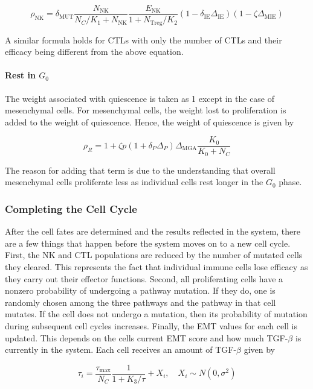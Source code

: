 \documentclass[11pt]{article}
\begin{document}
\begin{equation}\tag{2.3}
\rho_{\text{NK}} =\delta_{\text{MUT}} \frac{N_{\text{NK}}}{N_C/K_{1}+N_{\text{NK}}}  \frac{E_{\text{NK}}}{1+N_{\text{Treg}}/K_2} (1-\delta_{\text{IE}}\Delta_{\text{IE}})(1-\zeta \Delta_{\text{MIE}})
\end{equation}

A similar formula holds for CTLs with only the number of CTLs and their efficacy being different from the above equation.


\paragraph{Rest in $G_0$} 
The weight associated with quiescence is taken as 1 except in the case of mesenchymal cells.
For mesenchymal cells, the weight lost to proliferation is added to the weight of quiescence.
Hence, the weight of quiescence is given by

\begin{equation}\tag{2.4}
\rho_R = 1 + \zeta p(1+\delta_P\Delta_P)\Delta_{\text{MGA}}\frac{K_0}{K_0+N_C}
\end{equation}

The reason for adding that term is due to the understanding that overall mesenchymal cells proliferate less as individual cells rest longer in the $G_0$ phase.

\subsubsection{Completing the Cell Cycle}
After the cell fates are determined and the results reflected in the system, there are a few things that happen before the system moves on to a new cell cycle.
First, the NK and CTL populations are reduced by the number of mutated cells they cleared.
This represents the fact that individual immune cells lose efficacy as they carry out their effector functions. 
Second, all proliferating cells have a nonzero probability of undergoing a pathway mutation.
If they do, one is randomly chosen among the three pathways and the pathway in that cell mutates.
If the cell does not undergo a mutation, then its probability of mutation during subsequent cell cycles increases. 
Finally, the EMT values for each cell is updated.
This depends on the cells current EMT score and how much TGF-$\beta$ is currently in the system.
Each cell receives an amount of TGF-$\beta$ given by

\begin{equation}\tag{2.5}
\tau_i = \frac{\tau_{\text{max}}}{N_C}\frac{1}{1+K_3/\tau}+ X_i
, \quad X_i \sim N(0,\sigma^2)
\end{equation}
\end{document}
